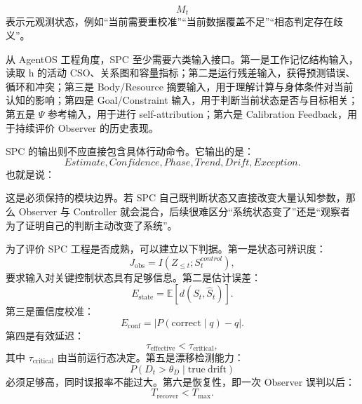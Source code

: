 \begin{equation}
M_t
\end{equation}
表示元观测状态，例如“当前需要重校准”“当前数据覆盖不足”“相态判定存在歧义”。

从 AgentOS 工程角度，SPC 至少需要六类输入接口。第一是工作记忆结构输入，读取 h 的活动 CSO、关系图和容量指标；第二是运行残差输入，获得预测错误、循环和冲突；第三是 Body/Resource 摘要输入，用于理解计算与身体条件对当前认知的影响；第四是 Goal/Constraint 输入，用于判断当前状态是否与目标相关；第五是 $\Psi$ 参考输入，用于进行 self-attribution；第六是 Calibration Feedback，用于持续评价 Observer 的历史表现。

SPC 的输出则不应直接包含具体行动命令。它输出的是：
\begin{equation}
Estimate,
Confidence,
Phase,
Trend,
Drift,
Exception.
\end{equation}
也就是说：
\begin{statementbox}
\centering
{}
\end{statementbox}
这是必须保持的模块边界。若 SPC 自己既判断状态又直接改变大量认知参数，那么 Observer 与 Controller 就会混合，后续很难区分“系统状态变了”还是“观察者为了证明自己的判断主动改变了系统”。

为了评价 SPC 工程是否成熟，可以建立以下判据。第一是状态可辨识度：
\begin{equation}
J_{\mathrm{obs}}
=
I(Z_{\leq t};S_t^{control}),
\end{equation}
要求输入对关键控制状态具有足够信息。第二是估计误差：
\begin{equation}
E_{\mathrm{state}}
=
\mathbb E
\left[
d(S_t,\hat S_t)
\right].
\end{equation}
第三是置信度校准：
\begin{equation}
E_{\mathrm{conf}}
=
\left|
P(\mathrm{correct}\mid q)-q
\right|.
\end{equation}
第四是有效延迟：
\begin{equation}
\tau_{\mathrm{effective}}
<
\tau_{\mathrm{critical}},
\end{equation}
其中 $\tau_{\mathrm{critical}}$ 由当前运行态决定。第五是漂移检测能力：
\begin{equation}
P
\left(
D_t>\theta_D
\mid
\mathrm{true\ drift}
\right)
\end{equation}
必须足够高，同时误报率不能过大。第六是恢复性，即一次 Observer 误判以后：
\begin{equation}
T_{\mathrm{recover}}
< T_{\max}.
\end{equation}

